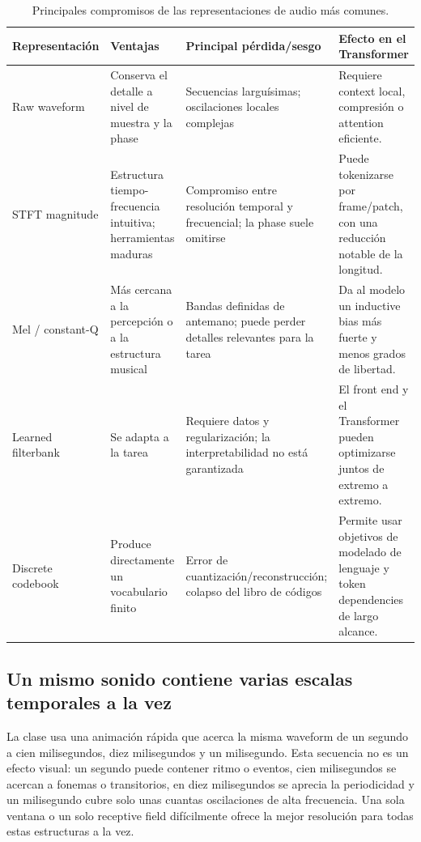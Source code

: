 
\begin{table}[H]
\centering
\small
\caption{Principales compromisos de las representaciones de audio más comunes.}
\begin{tabularx}{\textwidth}{L{0.19\textwidth}L{0.22\textwidth}L{0.22\textwidth}X}
\toprule
Representación & Ventajas & Principal pérdida/sesgo & Efecto en el Transformer \\
\midrule
Raw waveform & Conserva el detalle a nivel de muestra y la phase & Secuencias larguísimas; oscilaciones locales complejas & Requiere context local, compresión o attention eficiente. \\
STFT magnitude & Estructura tiempo-frecuencia intuitiva; herramientas maduras & Compromiso entre resolución temporal y frecuencial; la phase suele omitirse & Puede tokenizarse por frame/patch, con una reducción notable de la longitud. \\
Mel / constant-Q & Más cercana a la percepción o a la estructura musical & Bandas definidas de antemano; puede perder detalles relevantes para la tarea & Da al modelo un inductive bias más fuerte y menos grados de libertad. \\
Learned filterbank & Se adapta a la tarea & Requiere datos y regularización; la interpretabilidad no está garantizada & El front end y el Transformer pueden optimizarse juntos de extremo a extremo. \\
Discrete codebook & Produce directamente un vocabulario finito & Error de cuantización/reconstrucción; colapso del libro de códigos & Permite usar objetivos de modelado de lenguaje y token dependencies de largo alcance. \\
\bottomrule
\end{tabularx}
\end{table}

\subsection{Un mismo sonido contiene varias escalas temporales a la vez}

La clase usa una animación rápida que acerca la misma waveform de un segundo a cien milisegundos, diez milisegundos y un milisegundo. Esta secuencia no es un efecto visual: un segundo puede contener ritmo o eventos, cien milisegundos se acercan a fonemas o transitorios, en diez milisegundos se aprecia la periodicidad y un milisegundo cubre solo unas cuantas oscilaciones de alta frecuencia. Una sola ventana o un solo receptive field difícilmente ofrece la mejor resolución para todas estas estructuras a la vez.

